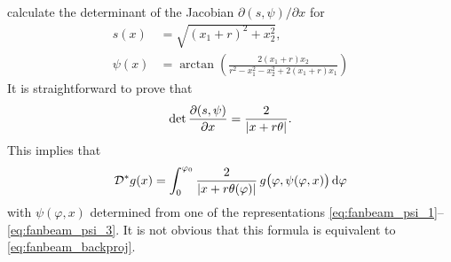\documentclass{amsart}
\renewcommand*{\phi}{\varphi}
\begin{document}
\begin{example}
 calculate  the determinant of the Jacobian $\partial(s,\psi)/\partial x$ for
 \begin{align*}
  s(x) &= \sqrt{(x_1 + r)^2 + x_2^2}, \\
  \psi(x) &= \arctan\left(\frac{2 (x_1 + r) x_2}{r^2 - x_1^2 - x_2^2 + 2 (x_1 + r) x_1} \right)
 \end{align*}
 It is straightforward to prove that
 \begin{equation}
  \label{eq:fanbeam_jacobian_det}
  \operatorname*{det} \frac{\partial(s,\psi)}{\partial x} = \frac{2}{|x + r\theta|}.
 \end{equation}
 This implies that
 \begin{equation}
  \label{eq:fanbeam_backproj_alt}
  \DUALOPD g(x) = \int_0^{\phi_0} \frac{2}{\ABS{x + r\theta(\phi)}}\, g\big(\phi, \psi(\phi,x)\big)\, \D\phi
 \end{equation}
 with $\psi(\phi, x)$ determined from one of the representations \eqref{eq:fanbeam_psi_1}--\eqref{eq:fanbeam_psi_3}. It is not obvious that 
 this formula is equivalent to \eqref{eq:fanbeam_backproj}. 
\end{example}
\end{document}
